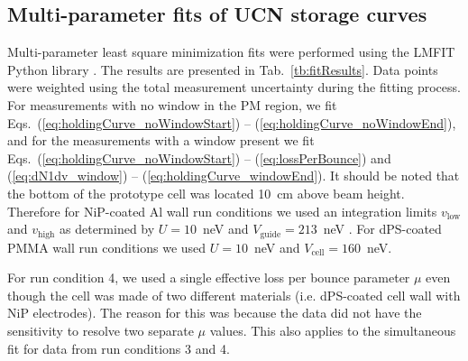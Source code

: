 
\subsection{\label{subsec:holdingCurveFits}Multi-parameter fits of UCN storage curves}


Multi-parameter least square minimization fits were performed using the LMFIT Python library \cite{newville_matthew_2014_11813}. The results are presented in Tab.~\ref{tb:fitResults}. Data points were weighted using the total measurement uncertainty during the fitting process. For measurements with no window in the PM region, we fit Eqs.~(\ref{eq:holdingCurve_noWindowStart}) -- (\ref{eq:holdingCurve_noWindowEnd}), and for the measurements with a window present we fit Eqs.~(\ref{eq:holdingCurve_noWindowStart}) -- (\ref{eq:lossPerBounce}) and (\ref{eq:dN1dv_window}) -- (\ref{eq:holdingCurve_windowEnd}). It should be noted that the bottom of the prototype cell was located \qty{10}{\cm} above beam height. Therefore for NiP-coated Al wall run conditions we used an integration limits $v_\text{low}$ and $v_\text{high}$ as determined by $U=10$~\unit{\nano\eV} and $V_\text{guide} = 213$~\unit{\nano\eV} \cite{pattie_jr_evaluation_2017}. For dPS-coated PMMA wall run conditions we used $U=10$~\unit{\nano\eV} and $V_\text{cell} =160$~\unit{\nano\eV}.

For run condition 4,  we used a single effective loss per bounce parameter $\mu$ even though the cell was made of two different materials (i.e. dPS-coated cell wall with NiP electrodes). The reason for this was because the data did not have the sensitivity to resolve two separate $\mu$ values. This also applies to the simultaneous fit for data from run conditions 3 and 4. 


